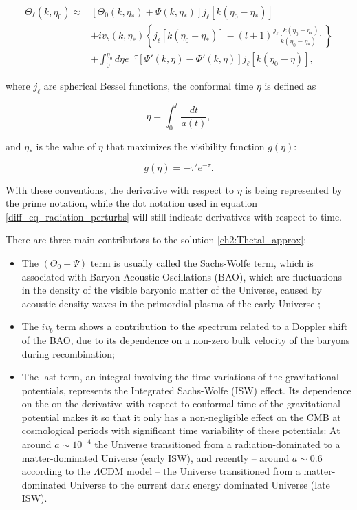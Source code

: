 \documentclass[openany,a4paper,12pt,oneside]{book}
\begin{document}
\begin{spacing}{1.5}
\begin{equation}\label{ch2:Thetal_approx}
\begin{split}
    \Theta_\ell(k,\eta_0)\approx &[\Theta_0(k,\eta_*)+\Psi(k,\eta_*)]j_\ell[k(\eta_0-\eta_*)]\\
    &+iv_b(k,\eta_*)\left\{j_\ell[k(\eta_0-\eta_*)]-(l+1)\frac{j_\ell[k(\eta_0-\eta_*)]}{k(\eta_0-\eta_*)}\right\}\\
    &+\int_0^{\eta_0} d\eta e^{-\tau}[\Psi'(k,\eta)-\Phi'(k,\eta)]j_\ell[k(\eta_0-\eta)],
\end{split}
\end{equation}

\noindent where $j_\ell$ are spherical Bessel functions, the conformal time $\eta$ is defined as

\begin{equation}\label{def:conformal_time}
    \eta=\int_0^t \frac{dt}{a(t)},
\end{equation}

\noindent and $\eta_*$ is the value of $\eta$ that maximizes the visibility function $g(\eta)$:

\begin{equation}\label{def:visibility_function}
    g(\eta)=-\tau'e^{-\tau}.
\end{equation}

With these conventions, the derivative with respect to $\eta$ is being represented by the prime notation, while the dot notation used in equation \eqref{diff_eq_radiation_perturbs} will still indicate derivatives with respect to time.

There are three main contributors to the solution \eqref{ch2:Thetal_approx}:

\begin{itemize}
    \item The $(\Theta_0+\Psi)$ term is usually called the Sachs-Wolfe term, which is associated with Baryon Acoustic Oscillations (BAO), which are fluctuations in the density of the visible baryonic matter of the Universe, caused by acoustic density waves in the primordial plasma of the early Universe \cite{dodelson2020modern};
    \item The $iv_b$ term shows a contribution to the spectrum related to a Doppler shift of the BAO, due to its dependence on a non-zero bulk velocity of the baryons during recombination;
    \item The last term, an integral involving the time variations of the gravitational potentials, represents the Integrated Sachs-Wolfe (ISW) effect. Its dependence on the on the derivative with respect to conformal time of the gravitational potential makes it so that it only has a non-negligible effect on the CMB at cosmological periods with significant time variability of these potentials: At around $a\sim 10^{-4}$ the Universe transitioned from a radiation-dominated to a matter-dominated Universe (early ISW), and recently -- around $a\sim 0.6$\cite{dark_energy_era} according to the $\Lambda$CDM model -- the Universe transitioned from a matter-dominated Universe to the current dark energy dominated Universe (late ISW). 
\end{itemize}


\end{spacing}
\end{document}

